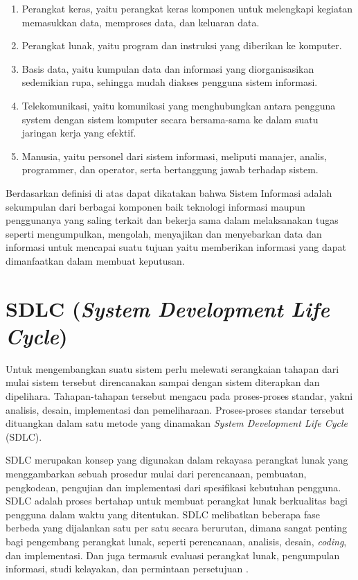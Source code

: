 \begin{enumerate}
	\item Perangkat keras, yaitu perangkat keras komponen untuk melengkapi kegiatan memasukkan data, memproses data, dan keluaran data.
	\item Perangkat lunak, yaitu program dan instruksi yang diberikan ke komputer.
	\item Basis data, yaitu kumpulan data dan informasi yang diorganisasikan sedemikian rupa, sehingga mudah diakses pengguna sistem informasi.
	\item Telekomunikasi, yaitu komunikasi yang menghubungkan antara pengguna system dengan sistem komputer secara bersama-sama ke dalam suatu jaringan kerja yang efektif. 
	\item Manusia, yaitu personel dari sistem informasi, meliputi manajer, analis, programmer, dan operator, serta bertanggung jawab terhadap sistem.   
\end{enumerate}

Berdasarkan definisi di atas dapat dikatakan bahwa Sistem Informasi adalah sekumpulan dari berbagai komponen baik teknologi informasi maupun penggunanya yang saling terkait dan bekerja sama dalam melaksanakan tugas seperti mengumpulkan, mengolah, menyajikan dan menyebarkan data dan informasi untuk mencapai suatu tujuan yaitu memberikan informasi yang dapat dimanfaatkan dalam membuat keputusan. 


\section{SDLC (\emph{System Development Life Cycle})}
Untuk mengembangkan suatu sistem perlu melewati serangkaian tahapan dari mulai sistem tersebut direncanakan sampai dengan sistem diterapkan dan dipelihara. Tahapan-tahapan tersebut mengacu pada proses-proses standar, yakni analisis, desain, implementasi dan pemeliharaan. Proses-proses standar tersebut dituangkan dalam satu metode yang dinamakan \emph{System Development Life Cycle} (SDLC). 

SDLC merupakan konsep yang digunakan dalam rekayasa perangkat lunak yang menggambarkan sebuah prosedur mulai dari perencanaan, pembuatan, pengkodean, pengujian dan implementasi dari spesifikasi kebutuhan pengguna. SDLC adalah proses bertahap untuk membuat perangkat lunak berkualitas bagi pengguna dalam waktu yang ditentukan. SDLC melibatkan beberapa fase berbeda yang dijalankan satu per satu secara berurutan, dimana sangat penting bagi pengembang perangkat lunak, seperti perencanaan, analisis, desain, \textit{coding}, dan implementasi. Dan juga termasuk evaluasi perangkat lunak, pengumpulan informasi, studi kelayakan, dan permintaan persetujuan \cite{Mohit}. 

